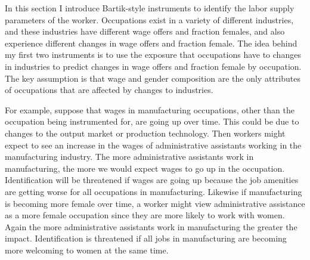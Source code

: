 \documentclass[12pt]{article}
\begin{document}
In this section I introduce Bartik-style instruments to identify the labor supply parameters of the worker. Occupations exist in a variety of different industries, and these industries have different wage offers and fraction females, and also experience different changes in wage offers and fraction female. The idea behind my first two instruments is to use the exposure that occupations have to changes in industries to predict changes in wage offers and fraction female by occupation. The key assumption is that wage and gender composition are the only attributes of occupations that are affected by changes to industries. 

For example, suppose that wages in manufacturing occupations, other than the occupation being instrumented for, are going up over time. This could be due to changes to the output market or production technology. Then workers might expect to see an increase in the wages of administrative assistants working in the manufacturing industry. The more administrative assistants work in manufacturing, the more we would expect wages to go up in the occupation. Identification will be threatened if wages are going up because the job amenities are getting worse for all occupations in manufacturing. Likewise if manufacturing is becoming more female over time, a worker might view administrative assistance as a more female occupation since they are more likely to work with women. Again the more administrative assistants work in manufacturing the greater the impact. Identification is threatened if all jobs in manufacturing are becoming more welcoming to women at the same time.




 



\end{document}
